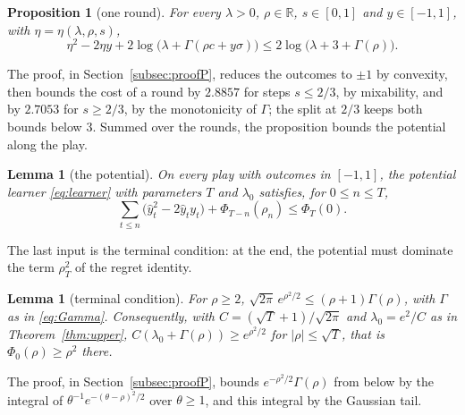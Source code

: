 \documentclass[12pt]{amsart}
\newtheorem{lemma}[theorem]{Lemma}
\newtheorem{proposition}[theorem]{Proposition}
\theoremstyle{definition}
\numberwithin{equation}{section}
\newcommand{\R}{\mathbb{R}}
\newcommand{\yh}{\hat y}
\newcommand{\leanmap}[1]{\ignorespaces}
\newcommand{\mapnote}[1]{\ignorespaces}
\begin{document}
\begin{proposition}[one round]\label{prop:P}
\leanmap{RegretKappa.UpperSharp.step_paper, RegretKappa.UpperSharp.step_abstract_sharp}
\mapnote{Lean proves it in the normalization $\Gamma/2$ of the formalization, where the increment is $3/2$, and in the variables of the learner with increment $3$.}
For every $\lambda>0$, $\rho\in\R$, $s\in[0,1]$ and $y\in[-1,1]$, with $\eta=\eta(\lambda,\rho,s)$,
\begin{equation}\label{eq:P}
\eta^2-2\eta y+2\log\bigl(\lambda+\Gamma(\rho c+y\sigma)\bigr)\le2\log\bigl(\lambda+3+\Gamma(\rho)\bigr).
\end{equation}
\end{proposition}

The proof, in Section~\ref{subsec:proofP}, reduces the outcomes to $\pm1$ by convexity, then bounds the cost of a round by $2.8857$ for steps $s\le2/3$, by mixability, and by $2.7053$ for $s\ge2/3$, by the monotonicity of $\Gamma$; the split at $2/3$ keeps both bounds below $3$. Summed over the rounds, the proposition bounds the potential along the play.

\begin{lemma}[the potential]\label{lem:potential}
\leanmap{RegretKappa.UpperSharp.potential_leU}
On every play with outcomes in $[-1,1]$, the potential learner \eqref{eq:learner} with parameters $T$ and $\lambda_0$ satisfies, for $0\le n\le T$,
\[
\sum_{t\le n}\bigl(\yh_t^2-2\yh_ty_t\bigr)+\Phi_{T-n}(\rho_n)\le\Phi_T(0).
\]
\end{lemma}

The last input is the terminal condition: at the end, the potential must dominate the term $\rho_T^2$ of the regret identity.

\begin{lemma}[terminal condition]\label{lem:terminal}
\leanmap{RegretKappa.UpperSharp.terminal_sharp, RegretKappa.UpperSharp.terminal_ineq}
For $\rho\ge2$, $\sqrt{2\pi}\,e^{\rho^2/2}\le(\rho+1)\Gamma(\rho)$, with $\Gamma$ as in \eqref{eq:Gamma}. Consequently, with $C=(\sqrt T+1)/\sqrt{2\pi}$ and $\lambda_0=e^2/C$ as in Theorem~\ref{thm:upper}, $C(\lambda_0+\Gamma(\rho))\ge e^{\rho^2/2}$ for $|\rho|\le\sqrt T$, that is $\Phi_0(\rho)\ge\rho^2$ there.
\end{lemma}

The proof, in Section~\ref{subsec:proofP}, bounds $e^{-\rho^2/2}\Gamma(\rho)$ from below by the integral of $\theta^{-1}e^{-(\theta-\rho)^2/2}$ over $\theta\ge1$, and this integral by the Gaussian tail.
\end{document}
